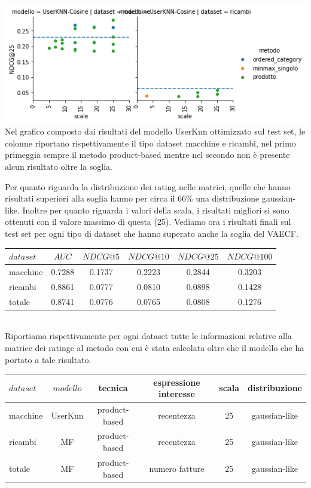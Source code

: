 \includegraphics[width=16cm]{figures/validazione_userknn.png}\\
Nel grafico composto dai risultati del modello UserKnn ottimizzato sul test set, le colonne riportano rispettivamente il tipo dataset macchine e ricambi, nel primo primeggia sempre il metodo product-based mentre nel secondo non è presente alcun risultato oltre la soglia.

Per quanto riguarda la distribuzione dei rating nelle matrici, quelle che hanno risultati superiori alla soglia hanno per circa il 66\% una distribuzione gaussian-like. Inoltre per quanto riguarda i valori della scala, i risultati migliori si sono ottenuti con il valore massimo di questa (25).
Vediamo ora i risultati finali sul test set per ogni tipo di dataset che hanno superato anche la soglia del VAECF.\\

\begin{tabular}{|l|ccccc|}
    \toprule
    $dataset$  & $AUC$ & $NDCG@5$ & $NDCG@10$  & $NDCG@25$ & $NDCG@100$  \\
    \midrule
    macchine & 0.7288 & 0.1737 & 0.2223 & 0.2844 & 0.3203 \\
    ricambi & 0.8861 & 0.0777 & 0.0810 & 0.0898 & 0.1428 \\
    totale  & 0.8741 & 0.0776 & 0.0765 & 0.0808 & 0.1276 \\
\bottomrule
\end{tabular}\\

Riportiamo rispettivamente per ogni dataset tutte le informazioni relative alla matrice dei ratinge al metodo con cui è stata calcolata oltre che il modello che ha portato a tale risultato.\\

\begin{tabular}{|l|ccccc|}
    \toprule
    $dataset$  & $modello$ & tecnica &espressione interesse & scala & distribuzione  \\
    \midrule
    macchine & UserKnn& product-based &recentezza & 25 & gaussian-like   \\
    ricambi & MF & product-based &recentezza & 25 & gaussian-like \\
    totale  & MF & product-based &numero fatture & 25 & gaussian-like \\
\bottomrule
\end{tabular}\\

